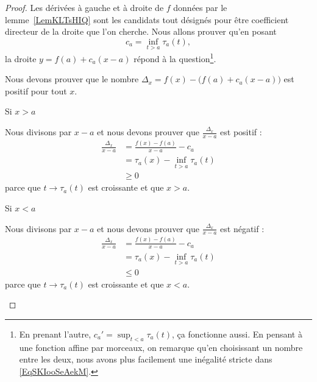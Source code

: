 \begin{proof}
    Les dérivées à gauche et à droite de \( f\) données par le lemme~\ref{LemKLTsHIQ} sont les candidats tout désignés pour être coefficient directeur de la droite que l'on cherche. Nous allons prouver qu'en posant
    \begin{equation}
        c_a=\inf_{t>a}\tau_a(t),
    \end{equation}
    la droite \( y=f(a)+c_a(x-a)\) répond à la question\footnote{En prenant l'autre, $c_a'=\sup_{t<a}\tau_a(t)$, ça fonctionne aussi. En pensant à une fonction affine par morceaux, on remarque qu'en choisissant un nombre entre les deux, nous avons plus facilement une inégalité stricte dans \eqref{EqSKIooSeAekM}.}.

    Nous devons prouver que le nombre \( \Delta_x=f(x)-\big( f(a)+c_a(x-a) \big)\) est positif pour tout \( x\).
    \begin{subproof}

    \item[Si \( x>a\)]

        Nous divisons par \( x-a\) et nous devons prouver que \( \frac{ \Delta_x }{ x-a }\) est positif :
        \begin{subequations}
            \begin{align}
                \frac{ \Delta_x }{ x-a }&=\frac{ f(x)-f(a) }{ x-a }-c_a\\
                &=\tau_a(x)-\inf_{t>a}\tau_a(t)\\
                &\geq 0
            \end{align}
        \end{subequations}
        parce que \( t\to\tau_a(t)\) est croissante et que \( x>a\).

    \item[Si \( x<a\)]

        Nous divisons par \( x-a\) et nous devons prouver que \( \frac{ \Delta_x }{ x-a }\) est négatif :
        \begin{subequations}
            \begin{align}
                \frac{ \Delta_x }{ x-a }&=\frac{ f(x)-f(a) }{ x-a }-c_a\\
                &=\tau_a(x)-\inf_{t>a}\tau_a(t)\\
                &\leq 0
            \end{align}
        \end{subequations}
        parce que \( t\to\tau_a(t)\) est croissante et que \( x<a\).
    \end{subproof}
\end{proof}

